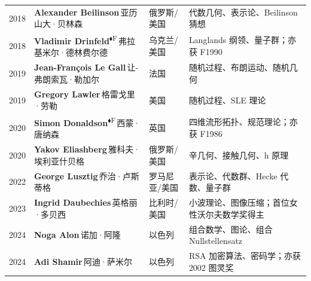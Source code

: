 \documentclass[a4paper,10pt]{article}
\newcommand{\Fbadge}{\textsuperscript{\normalfont\scriptsize\sffamily\color{fieldsclr}$\blacklozenge$F}}
\begin{document}
\begin{longtable}{
  >{\raggedright}m{1.8cm}
  >{\raggedright}m{7.0cm}
  >{\raggedright}m{4.2cm}
  >{\raggedright\arraybackslash}m{9.5cm}
}
{\color{yearcolor}2018} & {\bfseries Alexander Beilinson}\,{\small\color{mutedgray}亚历山大·贝林森} & 俄罗斯/美国 & {\small\color{fieldcolor}代数几何、表示论、Beilinson 猜想} \\[2pt]
{\color{yearcolor}2018} & {\bfseries Vladimir Drinfeld}\Fbadge\,{\small\color{mutedgray}弗拉基米尔·德林费尔德} & 乌克兰/美国 & {\small\color{fieldcolor}Langlands 纲领、量子群；亦获 F1990} \\[2pt]
{\color{yearcolor}2019} & {\bfseries Jean-François Le Gall}\,{\small\color{mutedgray}让-弗朗索瓦·勒加尔} & 法国 & {\small\color{fieldcolor}随机过程、布朗运动、随机几何} \\[2pt]
{\color{yearcolor}2019} & {\bfseries Gregory Lawler}\,{\small\color{mutedgray}格雷戈里·劳勒} & 美国 & {\small\color{fieldcolor}随机过程、SLE 理论} \\[2pt]
{\color{yearcolor}2020} & {\bfseries Simon Donaldson}\Fbadge\,{\small\color{mutedgray}西蒙·唐纳森} & 英国 & {\small\color{fieldcolor}四维流形拓扑、规范理论；亦获 F1986} \\[2pt]
{\color{yearcolor}2020} & {\bfseries Yakov Eliashberg}\,{\small\color{mutedgray}雅科夫·埃利亚什贝格} & 俄罗斯/美国 & {\small\color{fieldcolor}辛几何、接触几何、h 原理} \\[2pt]
{\color{yearcolor}2022} & {\bfseries George Lusztig}\,{\small\color{mutedgray}乔治·卢斯蒂格} & 罗马尼亚/美国 & {\small\color{fieldcolor}表示论、代数群、Hecke 代数、量子群} \\[2pt]
{\color{yearcolor}2023} & {\bfseries Ingrid Daubechies}\,{\small\color{mutedgray}英格丽·多贝西} & 比利时/美国 & {\small\color{fieldcolor}小波理论、图像压缩；首位女性沃尔夫数学奖得主} \\[2pt]
{\color{yearcolor}2024} & {\bfseries Noga Alon}\,{\small\color{mutedgray}诺加·阿隆} & 以色列 & {\small\color{fieldcolor}组合数学、图论、组合 Nullstellensatz} \\[2pt]
{\color{yearcolor}2024} & {\bfseries Adi Shamir}\,{\small\color{mutedgray}阿迪·萨米尔} & 以色列 & {\small\color{fieldcolor}RSA 加密算法、密码学；亦获 2002 图灵奖} \\[2pt]
\end{longtable}

\vspace{0.6em}
\end{document}
